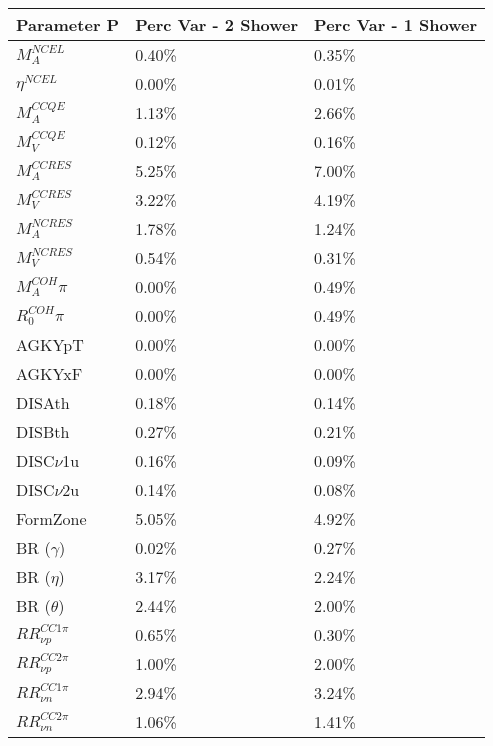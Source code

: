 \begin{table*}
\centering
{}
 \begin{tabular}{| l | l | l |}
 \hline
  Parameter P & Perc Var - 2 Shower & Perc Var - 1 Shower  \\ [0.1ex] \hline
$M_A^{NCEL}$ &  0.40\% & 0.35\% \\
$\eta^{NCEL}$  & 0.00\% & 0.01\% \\
$M_A^{CCQE}$  & 1.13\% & 2.66\% \\
$M_V^{CCQE}$  & 0.12\% & 0.16\% \\
$M_A^{CCRES}$  & 5.25\% & 7.00\% \\
$M_V^{CCRES}$  & 3.22\% & 4.19\% \\
$M_A^{NCRES}$  & 1.78\% & 1.24\% \\
$M_V^{NCRES}$  & 0.54\% & 0.31\%\\
$M_A^{COH}\pi$  & 0.00\% & 0.49\% \\
$R_0^{COH}\pi$  & 0.00\% & 0.49\%\\

AGKYpT & 0.00\% & 0.00\% \\
AGKYxF & 0.00\% & 0.00\% \\
DISAth & 0.18\% & 0.14\% \\
DISBth & 0.27\% & 0.21\% \\
DISC$\nu$1u & 0.16\% & 0.09\% \\
DISC$\nu$2u & 0.14\% & 0.08\% \\ \hline

FormZone  & 5.05\% & 4.92\% \\
BR ($\gamma$)  & 0.02\% & 0.27\% \\
BR ($\eta$)  & 3.17\% & 2.24\% \\
BR ($\theta$)  & 2.44\% & 2.00\% \\ \hline

$RR_{\nu p}^{CC1\pi}$ & 0.65\% & 0.30\% \\ 
$RR_{\nu p}^{CC2\pi}$ & 1.00\% & 2.00\% \\
$RR_{\nu n}^{CC1\pi}$ & 2.94\% & 3.24\% \\ 
$RR_{\nu n}^{CC2\pi}$ & 1.06\% & 1.41\% \\ \hline


\end{tabular}
\end{table*}
